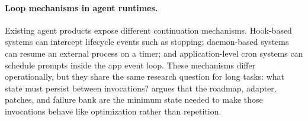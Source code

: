 \paragraph{Loop mechanisms in agent runtimes.}
Existing agent products expose different continuation mechanisms. Hook-based systems can intercept lifecycle events such as stopping; daemon-based systems can resume an external process on a timer; and application-level cron systems can schedule prompts inside the app event loop. These mechanisms differ operationally, but they share the same research question for long tasks: what state must persist between invocations? \ours{} argues that the roadmap, adapter, patches, and failure bank are the minimum state needed to make those invocations behave like optimization rather than repetition.
